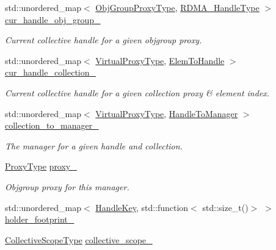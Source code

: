 \begin{DoxyCompactItemize}
\item 
std\+::unordered\+\_\+map$<$ \hyperlink{namespacevt_ad7cae989df485fccca57f0792a880a8e}{Obj\+Group\+Proxy\+Type}, \hyperlink{namespacevt_a10442579ec4e7ebef223818e64bcf908}{R\+D\+M\+A\+\_\+\+Handle\+Type} $>$ \hyperlink{structvt_1_1rdma_1_1_manager_a1aa2e20b7843cdc8efeddda319195113}{cur\+\_\+handle\+\_\+obj\+\_\+group\+\_\+}
\begin{DoxyCompactList}\small\item\em Current collective handle for a given objgroup proxy. \end{DoxyCompactList}\item 
std\+::unordered\+\_\+map$<$ \hyperlink{namespacevt_a1b417dd5d684f045bb58a0ede70045ac}{Virtual\+Proxy\+Type}, \hyperlink{structvt_1_1rdma_1_1_manager_ad794893058cec7595bc2bcb466ce7d3f}{Elem\+To\+Handle} $>$ \hyperlink{structvt_1_1rdma_1_1_manager_adde6a1913c6089be9439b5833489a66c}{cur\+\_\+handle\+\_\+collection\+\_\+}
\begin{DoxyCompactList}\small\item\em Current collective handle for a given collection proxy \& element index. \end{DoxyCompactList}\item 
std\+::unordered\+\_\+map$<$ \hyperlink{namespacevt_a1b417dd5d684f045bb58a0ede70045ac}{Virtual\+Proxy\+Type}, \hyperlink{structvt_1_1rdma_1_1_manager_aac6e7c58d320c302ea08461941d65f6e}{Handle\+To\+Manager} $>$ \hyperlink{structvt_1_1rdma_1_1_manager_ae579c90339a37d953a57dc942ff5f6d1}{collection\+\_\+to\+\_\+manager\+\_\+}
\begin{DoxyCompactList}\small\item\em The manager for a given handle and collection. \end{DoxyCompactList}\item 
\hyperlink{structvt_1_1rdma_1_1_manager_a75d5cdc6428ea19f5ec665b04dcd7166}{Proxy\+Type} \hyperlink{structvt_1_1rdma_1_1_manager_a033b59b7b1ecdf7e813d2999c03134cb}{proxy\+\_\+}
\begin{DoxyCompactList}\small\item\em Objgroup proxy for this manager. \end{DoxyCompactList}\item 
std\+::unordered\+\_\+map$<$ \hyperlink{structvt_1_1rdma_1_1_handle_key}{Handle\+Key}, std\+::function$<$ std\+::size\+\_\+t()$>$ $>$ \hyperlink{structvt_1_1rdma_1_1_manager_a7f037c941c0c8fc3d5b29b3d235bf280}{holder\+\_\+footprint\+\_\+}
\item 
\hyperlink{structvt_1_1rdma_1_1_manager_a7a5509b81547110f71aa85027520cfd5}{Collective\+Scope\+Type} \hyperlink{structvt_1_1rdma_1_1_manager_ad82ac94d4020fbdba45ee4bb8b69b7eb}{collective\+\_\+scope\+\_\+}
\end{DoxyCompactItemize}
